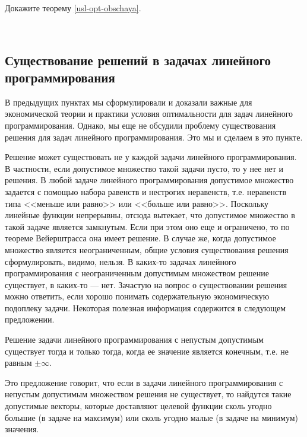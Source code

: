 \begin{exer}
    Докажите теорему \ref{usl-opt-obschaya}.
\end{exer}

\


\subsection{Существование решений в задачах линейного программирования}

    В предыдущих пунктах мы сформулировали и доказали важные для
    экономической теории и практики условия оптимальности для задач
    линейного программирования. Однако, мы еще не обсудили
    проблему существования решения для задач линейного
    программирования. Это мы и сделаем в это пункте.

    Решение может существовать не у каждой задачи линейного
    программирования. В частности, если допустимое множество такой
    задачи пусто, то у нее нет и решения. В любой задаче линейного
    программирования допустимое множество задается с помощью набора
    равенств и нестрогих неравенств, т.е. неравенств типа <<меньше
    или равно>> или <<больше или равно>>. Поскольку линейные функции непрерывны,
    отсюда вытекает, что
    допустимое множество в такой задаче является замкнутым. Если при
    этом оно еще и ограничено, то по теореме Вейерштрасса она имеет
    решение. В случае же, когда допустимое множество является
    неограниченным, общие условия существования решения
    сформулировать, видимо, нельзя. В каких-то задачах линейного
    программирования с неограниченным допустимым множеством решение
    существует, в каких-то --- нет. Зачастую на вопрос о существовании
    решения можно ответить, если хорошо понимать содержательную
    экономическую подоплеку задачи.
    Некоторая полезная информация содержится в следующем предложении.

\begin{prop} \label{sushestv-lp} Решение задачи линейного программирования с непустым
допустимым существует тогда и только тогда, когда ее значение
является конечным, т.е. не равным $\pm\infty$.
\end{prop}

    Это предложение говорит, что если в задачи линейного
    программирования
     с непустым допустимым множеством решения не существует, то найдутся
     такие допустимые векторы, которые доставляют целевой функции
     сколь угодно большие (в задаче на максимум) или сколь угодно малые
     (в задаче на минимум) значения.


